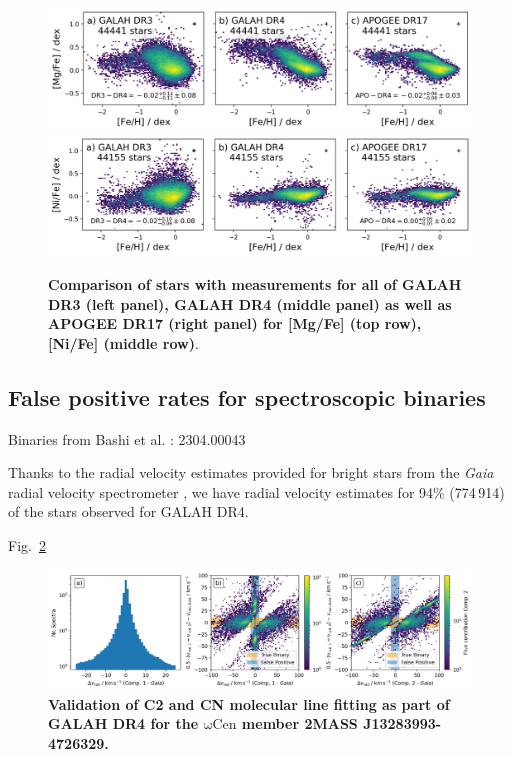 \documentclass[
  journal=pasa,
  manuscript=research-paper, %
  year=2023,
  volume=37
]{cup-journal}
\newcommand{\Gaia}{\textit{Gaia}\xspace}
\begin{document}
\begin{figure}
 \centering
 \includegraphics[width=\textwidth]{figures/comparison_dr4_dr3_apo17_Mg_fe.png}
 \includegraphics[width=\textwidth]{figures/comparison_dr4_dr3_apo17_Ni_fe.png}
 \caption{\textbf{Comparison of stars with measurements for all of GALAH DR3 (left panel), GALAH DR4 (middle panel) as well as APOGEE DR17 (right panel) for [Mg/Fe] (top row), [Ni/Fe] (middle row)}.}
 \label{fig:comparison_dr4_dr3_apo17}
\end{figure}

\subsection{False positive rates for spectroscopic binaries}

Binaries from Bashi et al. : 2304.00043 \citep{Bashi2023}

Thanks to the radial velocity estimates provided for bright stars from the \Gaia radial velocity spectrometer \citep{Katz2022}, we have radial velocity estimates for 94\% (774\,914) of the stars observed for GALAH DR4.

Fig.~\ref{fig:vrad_comparison_comp1_comp2_gaiadr3}

\begin{figure}[hbt]
 \centering
 \includegraphics[width=\textwidth]{figures/vrad_comparison_comp1_comp2_gaiadr3.png}
 \caption{\textbf{Validation of C2 and CN molecular line fitting as part of GALAH DR4 for the $\mathrm{\omega Cen}$ member 2MASS J13283993-4726329.}} %
 \label{fig:vrad_comparison_comp1_comp2_gaiadr3}
\end{figure}
\end{document}
